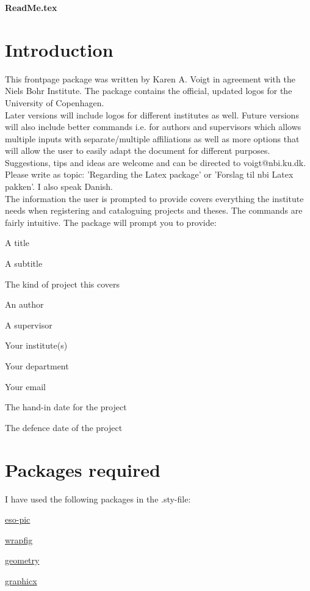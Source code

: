 
\begin{center}
{\Huge \textbf{ReadMe.tex}}
\end{center}

\section*{Introduction}

This frontpage package was written by Karen A. Voigt in agreement with the Niels Bohr Institute. The package contains the official, updated logos for the University of Copenhagen.\\

Later versions will include logos for different institutes as well. Future versions will also include better commands i.e. for authors and supervisors which allows multiple inputs with separate/multiple affiliations as well as more options that will allow the user to easily adapt the document for different purposes.\\

Suggestions, tips and ideas are welcome and can be directed to voigt@nbi.ku.dk. Please write as topic: 'Regarding the Latex package' or 'Forslag til nbi Latex pakken'. I also speak Danish.\\

The information the user is prompted to provide covers everything the institute needs when registering and cataloguing projects and theses. The commands are fairly intuitive. The package will prompt you to provide:\\

\begin{compactitem}[-]
\item A title
\item A subtitle
\item The kind of project this covers
\item An author
\item A supervisor
\item Your institute(s)
\item Your department
\item Your email
\item The hand-in date for the project
\item The defence date of the project
\end{compactitem}

\section*{Packages required}
I have used the following packages in the .sty-file:
\begin{compactitem}[-]
\item \href{https://www.ctan.org/pkg/eso-pic}{eso-pic}
\item \href{https://www.ctan.org/pkg/wrapfig}{wrapfig}
\item \href{https://www.ctan.org/pkg/geometry}{geometry}
\item \href{https://www.ctan.org/pkg/graphicx}{graphicx}
\end{compactitem}

